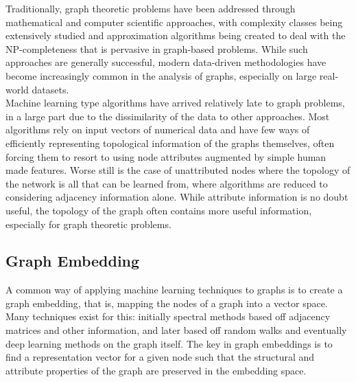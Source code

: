 \documentclass[12pt,twoside]{report}
\begin{document}
Traditionally, graph theoretic problems have been addressed through mathematical and computer scientific approaches, with complexity classes being extensively studied and approximation algorithms being created to deal with the NP-completeness that is pervasive in graph-based problems. While such approaches are generally successful, modern data-driven methodologies have become increasingly common in the analysis of graphs, especially on large real-world datasets. \\

Machine learning type algorithms have arrived relatively late to graph problems, in a large part due to the dissimilarity of the data to other approaches. Most algorithms rely on input vectors of numerical data and have few ways of efficiently representing topological information of the graphs themselves, often forcing them to resort to using node attributes augmented by simple human made features. Worse still is the case of unattributed nodes where the topology of the network is all that can be learned from, where algorithms are reduced to considering adjacency information alone. While attribute information is no doubt useful, the topology of the graph often contains more useful information, especially for graph theoretic problems. \\ 

\subsection{Graph Embedding}

A common way of applying machine learning techniques to graphs is to create a graph embedding, that is, mapping the nodes of a graph into a vector space. Many techniques exist for this: initially spectral methods based off adjacency matrices and other information, and later based off random walks and eventually deep learning methods on the graph itself. The key in graph embeddings is to find a representation vector for a given node such that the structural and attribute properties of the graph are preserved in the embedding space. \\
\end{document}
